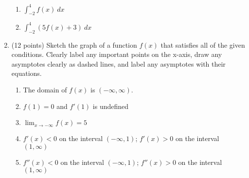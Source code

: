 \documentclass[12pt]{article}
\begin{document}
\begin{enumerate}
\begin{center}
\end{center}

\begin{enumerate}
\item $\displaystyle{\int_{-2}^4 f(x) \: dx}$
\vfill
\item
$\displaystyle{\int_{-2}^4 (5 f(x)+3) \: dx}$
\vfill
\end{enumerate}
\newpage
\item (12 points) Sketch the graph of a function $f(x)$ that satisfies all of the given conditions. Clearly label any important points on the x-axis, draw any asymptotes clearly as dashed lines, and label any asymptotes with their equations.
\begin{enumerate}
\item The domain of $f(x)$ is $(-\infty, \infty).$
\item $f(1)=0$ and $f'(1)$ is undefined
\item $\displaystyle{\lim_{x \to -\infty} f(x)=5}$
\item $f'(x) <0$ on the interval $(-\infty,1)$; $f'(x) > 0$ on the interval $(1, \infty)$
\item $f''(x) <0$ on the interval $(-\infty, 1)$; $f''(x) >0$ on the interval $(1,\infty)$
\end{enumerate}

\begin{center}
\end{center}



\end{enumerate}
\end{document}
